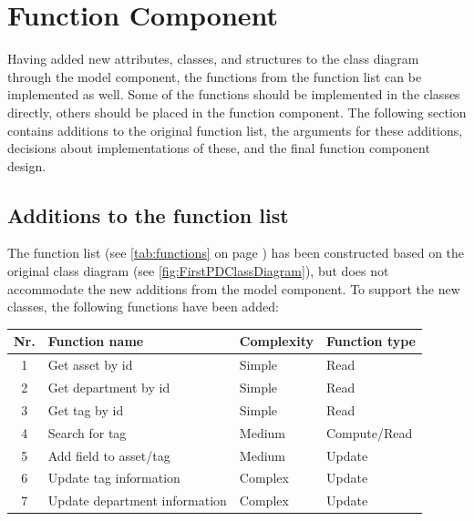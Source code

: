 \section{Function Component} \label{sc:function_component}
Having added new attributes, classes, and structures to the class diagram through the model component, the functions from the function list can be implemented as well. Some of the functions should be implemented in the classes directly, others should be placed in the function component. The following section contains additions to the original function list, the arguments for these additions, decisions about implementations of these, and the final function component design.

\subsection{Additions to the function list}
The function list (see \autoref{tab:functions} on page \pageref{tab:functions}) has been constructed based on the original class diagram (see \autoref{fig:FirstPDClassDiagram}), but does not accommodate the new additions from the model component. To support the new classes, the following functions have been added:

\begin{table}[H]
\centering
    \begin{tabular}{c|l|l|l}
        \textbf{Nr.} & \textbf{Function name} & \textbf{Complexity} & \textbf{Function type}\\
        \hline
        1 & Get asset by id & Simple & Read\\
        \hline
        2 & Get department by id & Simple & Read\\
        \hline
        3 & Get tag by id & Simple & Read\\
        \hline
        4 & Search for tag & Medium & Compute/Read\\
        \hline
        5 & Add field to asset/tag & Medium & Update\\
        \hline
        6 & Update tag information & Complex & Update\\
        \hline
        7 & Update department information & Complex & Update\\
        \hline
    \end{tabular}
\end{table}

